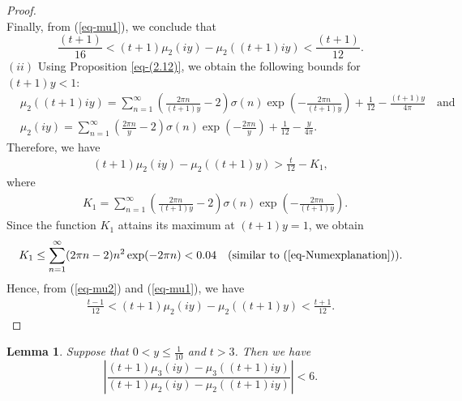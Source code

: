 \documentclass[11pt]{amsart}
\theoremstyle{plain}
\newtheorem{lemma}[theorem]{Lemma}
\numberwithin{equation}{section}
\begin{document}
\begin{proof}
\begin{equation*}
			\end{equation*}
			Finally, from (\ref{eq-mu1}), we conclude that
			\begin{equation*}
				\frac{(t+1)}{16}<(t+1)\mu_{2}(iy)-\mu_{2}((t+1)iy)<\frac{(t+1)}{12}.  
			\end{equation*}  
			$(ii)$ Using Proposition \ref{eq-(2.12)}, we obtain the following bounds for $(t+1)y < 1$:
			\begin{align*}
				&\mu_{2}((t+1)iy)=\sum_{n=1}^{\infty}\left(\frac{2\pi n}{(t+1)y}-2\right)\sigma(n) \exp\left(-\frac{2\pi n}{(t+1)y}\right)+\frac{1}{12}-\frac{(t+1)y}{4\pi}\quad\text{and}\\
				&\mu_{2}(iy)=\sum_{n=1}^{\infty}\left(\frac{2\pi n}{y}-2\right)\sigma(n) \exp\left(-\frac{2\pi n}{y}\right)+\frac{1}{12}-\frac{y}{4\pi}.
			\end{align*}
			Therefore, we have
			\begin{align}\label{eq-mu2}
				(t+1)\mu_{2}(iy)-\mu_{2}((t+1)y)>\frac{t}{12}-K_{1},
			\end{align}
			where 
			\begin{align*}
				&K_1=\sum_{n=1}^{\infty}\left(\frac{2\pi n}{(t+1)y}-2\right)\sigma(n) \exp\left(-\frac{2\pi n}{(t+1)y}\right).
			\end{align*}
			Since the function $K_{1}$ attains its maximum at $(t+1)y = 1$, we obtain
			\begin{align*}
				K_1\le\sum_{n=1}^{\infty}(2\pi n-2)n^{2}\exp(-2\pi n)<0.04\quad(\text{similar to (\ref{eq-Numexplanation})}).
			\end{align*}
			Hence, from (\ref{eq-mu2}) and (\ref{eq-mu1}), we have
			\begin{align*}
				\frac{t-1}{12}<(t+1)\mu_{2}(iy)-\mu_{2}((t+1)y)< \frac{t+1}{12}.
			\end{align*}
		\end{proof}
		\begin{lemma}
			Suppose that $0<y\le \frac{1}{10}$ and $t>3$. Then we have 
			\begin{equation*}\label{lemma-mu3}
				\left|\frac{(t+1)\mu_{3}(iy)-\mu_{3}((t+1)iy)}{(t+1)\mu_{2}(iy)-\mu_{2}((t+1)iy)}\right|<6.  
			\end{equation*}
		\end{lemma}
\end{document}
